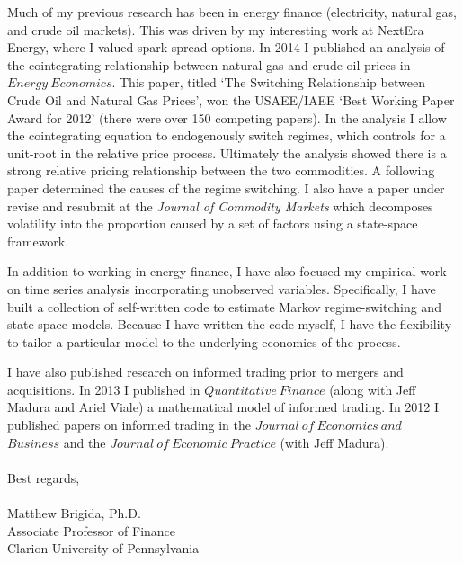 \documentclass[12pt]{article}
\begin{document}
Much of my previous research has been in energy finance (electricity, natural gas, and crude oil markets).  This was driven by my interesting work at NextEra Energy, where I valued spark spread options.  In 2014 I published an analysis of the cointegrating relationship between natural gas and crude oil prices in $Energy\ Economics$.  This paper, titled `The Switching Relationship between Crude Oil and Natural Gas Prices', won the USAEE/IAEE `Best Working Paper Award for 2012' (there were over 150 competing papers).  In the analysis I allow the cointegrating equation to endogenously switch regimes, which controls for a unit-root in the relative price process. Ultimately the analysis showed there is a strong relative pricing relationship between the two commodities.  A following paper determined the causes of the regime switching.  I also have a paper under revise and resubmit at the {\it Journal of Commodity Markets} which decomposes volatility into the proportion caused by a set of factors using a state-space framework.

In addition to working in energy finance, I have also focused my empirical work on time series analysis incorporating unobserved variables.  Specifically, I have built a collection of self-written code to estimate Markov regime-switching and state-space models.  Because I have written the code myself, I have the flexibility to tailor a particular model to the underlying economics of the process.  



I have also published research on informed trading prior to mergers and acquisitions.  In 2013 I published in $Quantitative\ Finance$ (along with Jeff Madura and Ariel Viale) a mathematical model of informed trading.  In 2012 I published papers on informed trading in the $Journal\ of\ Economics\ and$ \\ $ Business$ and the $Journal\ of\ Economic\ Practice$ (with Jeff Madura). 
\\
\\
Best regards,\\
\\
Matthew Brigida, Ph.D.\\
Associate Professor of Finance\\
Clarion University of Pennsylvania
\end{document}
